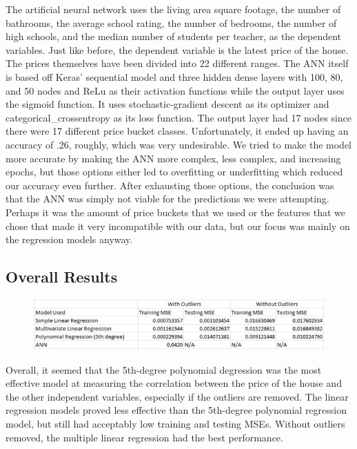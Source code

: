\documentclass[12pt]{article}
\begin{document}
	The artificial neural network uses the living area square footage, the number of bathrooms, the average school rating, the number of bedrooms, the number of high schools, and the median number of students per teacher, as the dependent variables. Just like before, the dependent variable is the latest price of the house. The prices themselves have been divided into 22 different ranges. The ANN itself is based off Keras' sequential model and three hidden dense layers with 100, 80, and 50 nodes and ReLu as their activation functions while the output layer uses the sigmoid function. It uses stochastic-gradient descent as its optimizer and categorical\_crossentropy as its loss function. The output layer had 17 nodes since there were 17 different price bucket classes. Unfortunately, it ended up having an accuracy of .26, roughly, which was very undesirable. We tried to make the model more accurate by making the ANN more complex, less complex, and increasing epochs, but those options either led to overfitting or underfitting which reduced our accuracy even further. After exhausting those options, the conclusion was that the ANN was simply not viable for the predictions we were attempting. Perhaps it was the amount of price buckets that we used or the features that we chose that made it very incompatible with our data, but our focus was mainly on the regression models anyway.
	
	\subsection{Overall Results}
	
	\begin{figure}[H]
		\label{fig:fig5}
		\includegraphics[width=1\linewidth]{fig5}
	\end{figure}

	Overall, it seemed that the 5th-degree polynomial degression was the most effective model at measuring the correlation between the price of the house and the other independent variables, especially if the outliers are removed. The linear regression models proved less effective than the 5th-degree polynomial regression model, but still had acceptably low training and testing MSEs. Without outliers removed, the multiple linear regression had the best performance.
	
\end{document}
